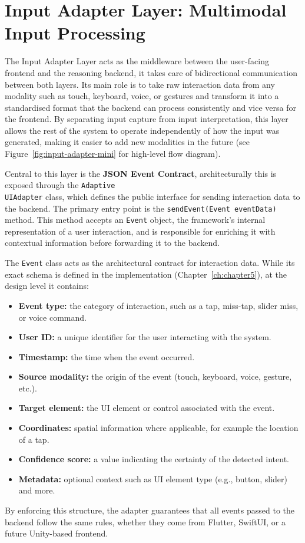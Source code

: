 \section{Input Adapter Layer: Multimodal Input Processing}
The Input Adapter Layer acts as the middleware between the user-facing frontend and the reasoning backend, it takes care of bidirectional communication between both layers. Its main role is to take raw interaction data from any modality such as touch, keyboard, voice, or gestures and transform it into a standardised format that the backend can process consistently and vice versa for the frontend. By separating input capture from input interpretation, this layer allows the rest of the system to operate independently of how the input was generated, making it easier to add new modalities in the future  (see Figure~\ref{fig:input-adapter-mini} for high-level flow diagram).

Central to this layer is the \textbf{JSON Event Contract}, architecturally this is exposed through the \texttt{Adaptive\\UIAdapter} class, which defines the public interface for sending interaction data to the backend. The primary entry point is the \texttt{sendEvent(Event eventData)} method. This method accepts an \texttt{Event} object, the framework’s internal representation of a user interaction, and is responsible for enriching it with contextual information before forwarding it to the backend.

The \texttt{Event} class acts as the architectural contract for interaction data. While its exact schema is defined in the implementation (Chapter~\ref{ch:chapter5}), at the design level it contains:
\begin{itemize}
    \item \textbf{Event type:}  the category of interaction, such as a tap, miss-tap, slider miss, or voice command.
    \item \textbf{User ID:} a unique identifier for the user interacting with the system.
    \item \textbf{Timestamp:} the time when the event occurred.
    \item \textbf{Source modality:} the origin of the event (touch, keyboard, voice, gesture, etc.).
    \item \textbf{Target element:} the UI element or control associated with the event.
    \item \textbf{Coordinates:} spatial information where applicable, for example the location of a tap.
    \item \textbf{Confidence score:} a value indicating the certainty of the detected intent.
    \item \textbf{Metadata:} optional context such as UI element type (e.g., button, slider) and more.
\end{itemize}
By enforcing this structure, the adapter guarantees that all events passed to the backend follow the same rules, whether they come from Flutter, SwiftUI, or a future Unity-based frontend.

